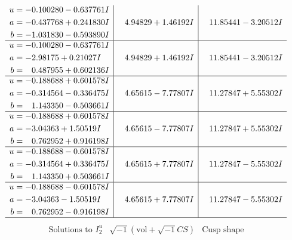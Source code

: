 \documentclass[1p]{elsarticle_modified}
\theoremstyle{definition}
\newcommand{\I}{\sqrt{-1}}
\begin{document}
$$\begin{array}{c|c|c}
\begin{aligned}
u &= -0.100280 - 0.637761 I \\
a &= -0.437768 + 0.241830 I \\
b &= -1.031830 - 0.593890 I\end{aligned}
 & \phantom{-}4.94829 + 1.46192 I & \phantom{-}11.85441 - 3.20512 I \\ \hline\begin{aligned}
u &= -0.100280 - 0.637761 I \\
a &= -2.98175 + 0.21027 I \\
b &= \phantom{-}0.487955 + 0.602136 I\end{aligned}
 & \phantom{-}4.94829 + 1.46192 I & \phantom{-}11.85441 - 3.20512 I \\ \hline\begin{aligned}
u &= -0.188688 + 0.601578 I \\
a &= -0.314564 - 0.336475 I \\
b &= \phantom{-}1.143350 - 0.503661 I\end{aligned}
 & \phantom{-}4.65615 - 7.77807 I & \phantom{-}11.27847 + 5.55302 I \\ \hline\begin{aligned}
u &= -0.188688 + 0.601578 I \\
a &= -3.04363 + 1.50519 I \\
b &= \phantom{-}0.762952 + 0.916198 I\end{aligned}
 & \phantom{-}4.65615 - 7.77807 I & \phantom{-}11.27847 + 5.55302 I \\ \hline\begin{aligned}
u &= -0.188688 - 0.601578 I \\
a &= -0.314564 + 0.336475 I \\
b &= \phantom{-}1.143350 + 0.503661 I\end{aligned}
 & \phantom{-}4.65615 + 7.77807 I & \phantom{-}11.27847 - 5.55302 I \\ \hline\begin{aligned}
u &= -0.188688 - 0.601578 I \\
a &= -3.04363 - 1.50519 I \\
b &= \phantom{-}0.762952 - 0.916198 I\end{aligned}
 & \phantom{-}4.65615 + 7.77807 I & \phantom{-}11.27847 - 5.55302 I\\
 \hline 
 \end{array}$$\newpage$$\begin{array}{c|c|c}  
\text{Solutions to }I^u_{2}& \I (\text{vol} + \sqrt{-1}CS) & \text{Cusp shape}\\

\end{array}$$
\end{document}
